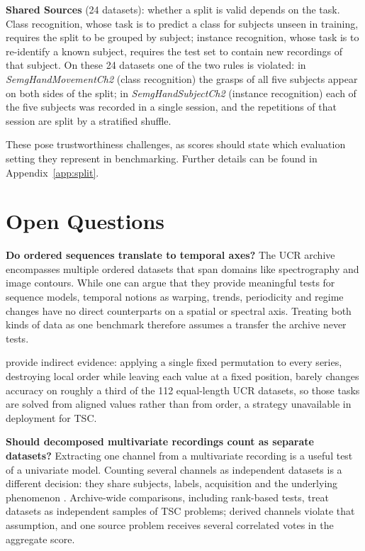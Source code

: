 \documentclass{article}
\newcommand{\ds}[1]{\emph{\hspace{0pt}#1}}
\begin{document}
\textbf{Shared Sources} (24 datasets):  whether a split is valid depends on the task. 
Class recognition, whose task is to predict a class for subjects unseen in training, requires the split to be grouped by subject; instance recognition, whose task is to re-identify a known subject, requires the test set to contain new recordings of that subject.
On these 24 datasets one of the two rules is violated: in \ds{SemgHandMovementCh2} (class recognition) the grasps of all five subjects appear on both sides of the split;
in \ds{SemgHandSubjectCh2} (instance recognition) each of the five subjects was recorded in a single session, and the repetitions of that session are split by a stratified shuffle. %


These pose trustworthiness challenges, as scores should state which evaluation setting they represent in benchmarking. Further details can be found in Appendix~\ref{app:split}. 








\section{Open Questions} \label{sec:open-questions}
\textbf{Do ordered sequences translate to temporal axes?}
The UCR archive encompasses multiple ordered datasets that span domains like spectrography and image contours. While one can argue that they provide meaningful tests for sequence models, temporal notions as warping, trends, periodicity and regime changes have no direct counterparts on a spatial or spectral axis. Treating both kinds of data as one benchmark therefore assumes a transfer the archive never tests\citep{bagnall2016bakeoff,middlehurst2024redux}.

\citet{zhang2025revisit} provide indirect evidence: applying a single fixed permutation to every series, destroying local order while leaving each value at a fixed position, barely changes accuracy on roughly a third of the 112 equal-length UCR datasets, so those tasks are solved from aligned values rather than from order, a strategy unavailable in deployment for TSC.



\textbf{Should decomposed multivariate recordings count as separate datasets?}
Extracting one channel from a multivariate recording is a useful test of a univariate model. Counting several channels as independent datasets is a different decision: they share subjects, labels, acquisition and the underlying phenomenon \citep{dau2019ucr,tscarchive_descriptions}. Archive-wide comparisons, including rank-based tests, treat datasets as independent samples of TSC problems; derived channels violate that assumption, and one source problem receives several correlated votes in the aggregate score.
\end{document}
